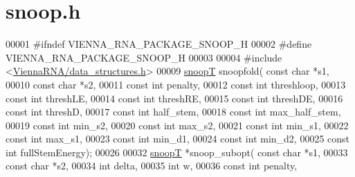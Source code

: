 \hypertarget{snoop_8h_source}{}\section{snoop.\+h}
\label{snoop_8h_source}

\begin{DoxyCode}
00001 \textcolor{preprocessor}{#ifndef VIENNA\_RNA\_PACKAGE\_SNOOP\_H}
00002 \textcolor{preprocessor}{#define VIENNA\_RNA\_PACKAGE\_SNOOP\_H}
00003 
00004 \textcolor{preprocessor}{#include <\hyperlink{data__structures_8h}{ViennaRNA/data\_structures.h}>}
00009 \hyperlink{group__data__structures_structsnoopT}{snoopT} snoopfold( \textcolor{keyword}{const} \textcolor{keywordtype}{char} *s1,
00010                   \textcolor{keyword}{const} \textcolor{keywordtype}{char} *s2, 
00011                   \textcolor{keyword}{const} \textcolor{keywordtype}{int} penalty,
00012                   \textcolor{keyword}{const} \textcolor{keywordtype}{int} threshloop, 
00013                   \textcolor{keyword}{const} \textcolor{keywordtype}{int} threshLE,
00014                   \textcolor{keyword}{const} \textcolor{keywordtype}{int} threshRE,
00015                   \textcolor{keyword}{const} \textcolor{keywordtype}{int} threshDE,
00016                   \textcolor{keyword}{const} \textcolor{keywordtype}{int} threshD,
00017                   \textcolor{keyword}{const} \textcolor{keywordtype}{int} half\_stem,
00018                   \textcolor{keyword}{const} \textcolor{keywordtype}{int} max\_half\_stem,
00019                   \textcolor{keyword}{const} \textcolor{keywordtype}{int} min\_s2,
00020                   \textcolor{keyword}{const} \textcolor{keywordtype}{int} max\_s2,
00021                   \textcolor{keyword}{const} \textcolor{keywordtype}{int} min\_s1,
00022                   \textcolor{keyword}{const} \textcolor{keywordtype}{int} max\_s1,
00023                   \textcolor{keyword}{const} \textcolor{keywordtype}{int} min\_d1,
00024                   \textcolor{keyword}{const} \textcolor{keywordtype}{int} min\_d2,
00025       \textcolor{keyword}{const} \textcolor{keywordtype}{int} fullStemEnergy);
00026 
00032 \hyperlink{group__data__structures_structsnoopT}{snoopT} *snoop\_subopt( \textcolor{keyword}{const} \textcolor{keywordtype}{char} *s1,
00033                       \textcolor{keyword}{const} \textcolor{keywordtype}{char} *s2,
00034                       \textcolor{keywordtype}{int} delta,
00035                       \textcolor{keywordtype}{int} w,
00036                       \textcolor{keyword}{const} \textcolor{keywordtype}{int} penalty,

\end{DoxyCode}
